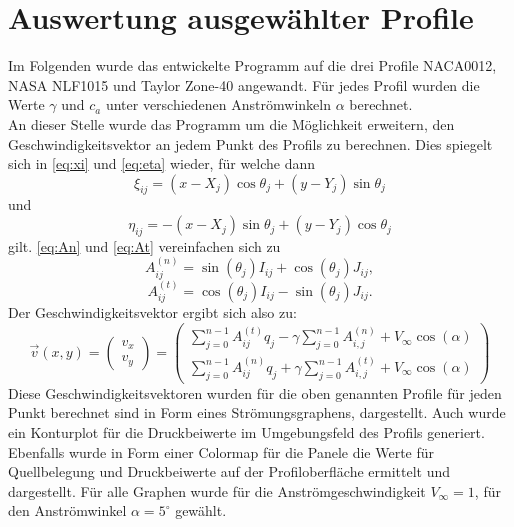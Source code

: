 \section{Auswertung ausgewählter Profile}
Im Folgenden wurde das entwickelte Programm auf die drei Profile NACA0012, NASA NLF1015 und Taylor Zone-40 angewandt. Für jedes Profil wurden die Werte $\gamma$ und $c_a$ unter verschiedenen Anströmwinkeln $\alpha $ berechnet. \\
An dieser Stelle wurde das Programm um die Möglichkeit erweitern, den Geschwindigkeitsvektor an jedem Punkt des Profils zu berechnen. Dies spiegelt sich in \eqref{eq:xi} und \eqref{eq:eta} wieder, für welche dann
\begin{equation}
\xi_{ij} =  (x - X_j) \cos \theta _j + (y - Y_j) \sin \theta _j
\end{equation}
und
\begin{equation}
\eta_{ij} =  -(x - X_j) \sin \theta _j + (y - Y_j) \cos \theta _j
\end{equation}
gilt. \eqref{eq:An} und \eqref{eq:At} vereinfachen sich zu
\begin{equation}
A_{ij}^{(n)} = \sin {(\theta _j)} I_{ij} + \cos{( \theta _j)} J_{ij},
\end{equation}
\begin{equation}
A_{ij}^{(t)} =  \cos{(\theta _j)} I_{ij} - \sin{( \theta _j)} J_{ij}.
\end{equation}
Der Geschwindigkeitsvektor ergibt sich also zu:
\begin{equation}
\vec v (x,y) = 
\begin{pmatrix}
v_x \\
v_y
\end{pmatrix}
=
\begin{pmatrix}
\sum_{j=0}^{n-1} A_{ij}^{(t)} q_j - \gamma \sum_{j=0}^{n-1}A_{i,j}^{(n)} + V_{\infty} \cos{(\alpha)} \\
\sum_{j=0}^{n-1} A_{ij}^{(n)} q_j + \gamma \sum_{j=0}^{n-1}A_{i,j}^{(t)} + V_{\infty} \cos{(\alpha)}
\end{pmatrix}
\end{equation}
Diese Geschwindigkeitsvektoren wurden für die oben genannten Profile für jeden Punkt berechnet sind in Form eines Strömungsgraphens, dargestellt. Auch wurde ein Konturplot für die Druckbeiwerte im Umgebungsfeld des Profils generiert. \\
Ebenfalls wurde in Form einer Colormap für die Panele die Werte für Quellbelegung und Druckbeiwerte auf der Profiloberfläche ermittelt und dargestellt. Für alle Graphen wurde für die Anströmgeschwindigkeit $V_{\infty} = 1$, für den Anströmwinkel $\alpha =5^{\circ}$ gewählt.

